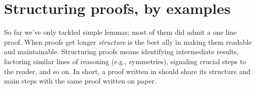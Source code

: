 % 
% 
% 
% 
% 
% 
% 
\section{Structuring proofs, by examples}

So far we've only tackled simple lemmas; most of them did admit a one line
proof.  When proofs get longer \emph{structure} is the best ally in making
them readable and maintainable.  Structuring proofs means identifying
intermediate results, factoring similar lines of reasoning (e.g., symmetries),
signaling crucial steps to the reader, and so on.  In short, a
proof written in \Coq{} should share its structure and main steps
with the same proof written on paper.

